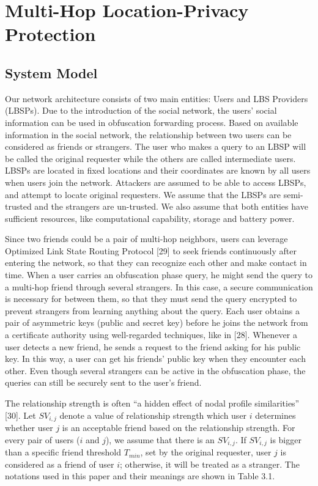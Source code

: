 \chapter {Multi-Hop Location-Privacy Protection}
\label{C_MHLPP}

\section{ System Model}

\noindent Our network architecture consists of two main entities: Users and LBS Providers (LBSPs). Due to the introduction of the social network, the users' social information can be used in obfuscation forwarding process. Based on available information in the social network, the relationship between two users can be considered as friends or strangers. The user who makes a query to an LBSP will be called the original requester while the others are called intermediate users. LBSPs are located in fixed locations and their coordinates are known by all users when users join the network. Attackers are assumed to be able to access LBSPs, and attempt to locate original requesters. We assume that the LBSPs are semi-trusted and the strangers are un-trusted. We also assume that both entities have sufficient resources, like computational capability, storage and battery power.

Since two friends could be a pair of multi-hop neighbors, users can leverage Optimized Link State Routing Protocol [29] to seek friends continuously after entering the network, so that they can recognize each other and make contact in time. When a user carries an obfuscation phase query, he might send the query to a multi-hop friend through several strangers. In this case, a secure communication is necessary for between them, so that they must send the query encrypted to prevent strangers from learning anything about the query. Each user obtains a pair of asymmetric keys (public and secret key) before he joins the network from a certificate authority using well-regarded techniques, like in [28]. Whenever a user detects a new friend, he sends a request to the friend asking for his public key. In this way, a user can get his friends' public key when they encounter each other. Even though several strangers can be active in the obfuscation phase, the queries can still be securely sent to the user's friend.

The relationship strength is often ``a hidden effect of nodal profile similarities'' [30]. Let ${SV}_{i,j}$ denote a value of relationship strength which user $i$ determines whether user $j$ is an acceptable friend based on the relationship strength. For every pair of users ($i$ and $j$), we assume that there is an ${SV}_{i,j}$. If ${SV}_{i,j}$ is bigger than a specific friend threshold $T_{min}$, set by the original requester, user $j$ is considered as a friend of user $i$; otherwise, it will be treated as a stranger. The notations used in this paper and their meanings are shown in Table 3.1. 


